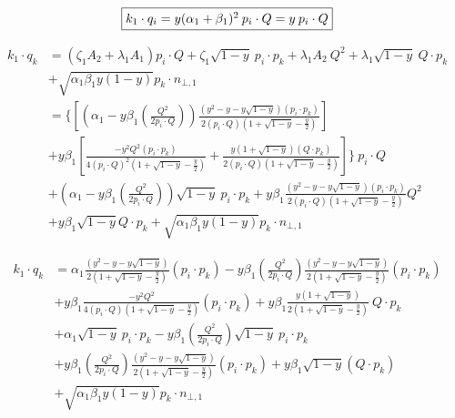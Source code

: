 \begin{equation}
	\begin{aligned}
		\fbox{$  k_1 \cdot q_i=y({\alpha_1}+\beta_1)^2\:p_i\cdot Q = y\:p_i\cdot Q $}
    \end{aligned}
\end{equation}

\begin{equation}
	\begin{aligned}	
	k_1 \cdot q_k &= (\zeta_1 A_2 + \lambda_1 A_1)p_i \cdot Q+\zeta_1 \sqrt{1-y}\:p_i\cdot p_k + \lambda_1 A_2\:Q^2+ \lambda_1\sqrt{1-y}\:Q\cdot p_k\\
	&+\sqrt{\alpha_1\beta_1y(1-y)} p_k \cdot {n_{\bot,1}}\\	
	&=\lbrace[(\alpha_1 -y\beta_1(\frac{Q^2}{2p_i \cdot Q}))\frac{(y^2 -y-y\sqrt{1-y}) (p_{i}\cdot {p_k})}{2(p_i\cdot Q)(1+\sqrt{1-y}-\frac{y}{2})}]\\&
	+y\beta_1[\frac{-y^2 Q^2 (p_{i}\cdot {p_k})}{4(p_i\cdot Q)^2(1+\sqrt{1-y}-\frac{y}{2})}+ \frac{y(1+\sqrt{1-y})(Q \cdot {p_k})}{2(p_i\cdot Q)(1+\sqrt{1-y}-\frac{y}{2})}]\rbrace\:p_i \cdot Q\\
	&+(\alpha_1 -y\beta_1(\frac{Q^2}{2p_i \cdot Q}))\sqrt{1-y}\:p_i \cdot p_k+y\beta_1\frac{(y^2 -y-y\sqrt{1-y}) (p_{i}\cdot {p_k})}{2(p_i\cdot Q)(1+\sqrt{1-y}-\frac{y}{2})}Q^2\\
	&+y\beta_1\sqrt{1-y} Q\cdot p_k+\sqrt{\alpha_1\beta_1y(1-y)} p_k \cdot {n_{\bot,1}} 
    \end{aligned}
\end{equation}

\begin{equation}
	\begin{aligned}
	k_1 \cdot q_k &= \alpha_1 \frac{(y^2 -y-y\sqrt{1-y}) }{2(1+\sqrt{1-y}-\frac{y}{2})}(p_{i}\cdot {p_k})
	-y\beta_1(\frac{Q^2}{2p_i \cdot Q})\frac{(y^2 -y-y\sqrt{1-y})}{2(1+\sqrt{1-y}-\frac{y}{2})}(p_{i}\cdot {p_k})\\
&+y\beta_1\frac{-y^2 Q^2 }{4(p_i\cdot Q)(1+\sqrt{1-y}-\frac{y}{2})}(p_{i}\cdot {p_k})+ y\beta_1\frac{y(1+\sqrt{1-y})}{2(1+\sqrt{1-y}-\frac{y}{2})}\:Q \cdot p_k\\
	&+\alpha_1 \sqrt{1-y}\:p_i \cdot p_k-y\beta_1(\frac{Q^2}{2p_i \cdot Q})\sqrt{1-y}\:p_i \cdot p_k\\
	&+y\beta_1(\frac{Q^2}{2p_i \cdot Q})\frac{(y^2 -y-y\sqrt{1-y})}{2(1+\sqrt{1-y}-\frac{y}{2})}(p_{i}\cdot {p_k})+y\beta_1\sqrt{1-y}(Q\cdot p_k)\\
	&+\sqrt{\alpha_1\beta_1y(1-y)} p_k \cdot {n_{\bot,1}} 
    \end{aligned}
\end{equation}


